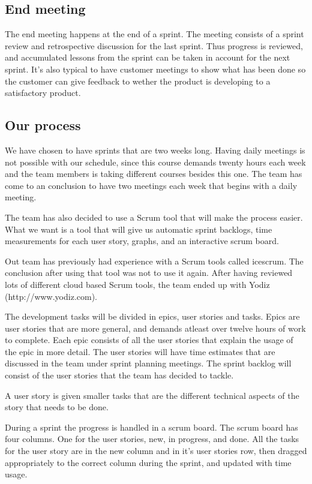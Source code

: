 \subsection{End meeting}
The end meeting happens at the end of a sprint. The meeting consists of a sprint review and retrospective discussion for the last sprint.
Thus progress is reviewed, and accumulated lessons from the sprint can be taken in account for the next sprint.
It's also typical to have customer meetings to show what has been done so the customer can give feedback to wether the product is developing to a satisfactory product.

\subsection{Our process}
We have chosen to have sprints that are two weeks long. Having daily meetings is not possible with our schedule,
since this course demands twenty hours each week and the team members is taking different courses besides this one.
The team has come to an conclusion to have two meetings each week that begins with a daily meeting.

The team has also decided to use a Scrum tool that will make the process easier.
What we want is a tool that will give us automatic sprint backlogs, time measurements for each user story, graphs, and an interactive scrum board.

Out team has previously had experience with a Scrum tools called icescrum. The conclusion after using that tool was not to use it again.
After having reviewed lots of different cloud based Scrum tools, the team ended up with Yodiz (http://www.yodiz.com).

The development tasks will be divided in epics, user stories and tasks. Epics are user stories that are more general, and demands  atleast over twelve hours of work to complete. Each epic consists
of all the user stories that explain the usage of the epic in more detail. The user stories will have time estimates that are discussed in the team under sprint planning meetings.
The sprint backlog will consist of the user stories that the team has decided to tackle.

A user story is given smaller tasks that are the different technical aspects of the story that needs to be done.

During a sprint the progress is handled in a scrum board. The scrum board has four columns. One for the user stories, new, in progress, and done.
All the tasks for the user story are in the new column and in it's user stories row, then dragged appropriately to the correct column during the sprint, and updated with time usage.
